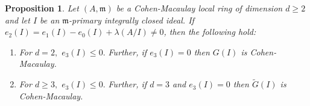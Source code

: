 \documentclass[10pt,a4paper]{amsart}
\newtheorem{proposition}{Proposition}
\newcommand{\m}{\mathfrak{m}}
\newcommand{\wt}{\widetilde}
\begin{document}
\begin{proposition}\label{e3bd}
Let $(A,\m) $ be a Cohen-Macaulay local ring of dimension $d \geq 2$ and let $I$ be an $\m$-primary integrally closed ideal. If $e_2(I)=e_1(I)-e_0(I)+\lambda(A/I)\neq 0$, then the following hold:
\begin{enumerate} [\normalfont(i)]
    \item \label{e3bd(i)} For $d=2,$ $e_3(I)\leq 0.$ Further, if  $e_3(I)=0$ then $G(I)$ is Cohen-Macaulay.

    \item \label{e3bd(ii)} For $d\geq 3,$ $e_3(I)\leq 0.$ Further, if $d=3$ and $e_3(I)=0$ then $\wt{G}(I)$ is Cohen-Macaulay. %
\end{enumerate}
\end{proposition}
\end{document}

